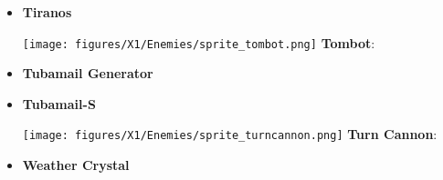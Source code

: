 \begin{itemize}
	\item \hypertarget {enem:Tiranos}{\textbf{Tiranos}}
	
	\item[{\texttt{[image: figures/X1/Enemies/sprite\_tombot.png]}}] \hypertarget{enem:Tombot}{\textbf{Tombot}}:
	
	\item \hypertarget {enem:Tubamail_Generator}{\textbf{Tubamail Generator}}
	\item \hypertarget {enem:Tubamail-S}{\textbf{Tubamail-S}}
	
	\item[{\texttt{[image: figures/X1/Enemies/sprite\_turncannon.png]}}] \hypertarget{enem:Turn_Cannon}{\textbf{Turn Cannon}}: 
	
	\item \hypertarget{enem:Weather_crystal}{\textbf{Weather Crystal}}
	
	
	
\end{itemize}











